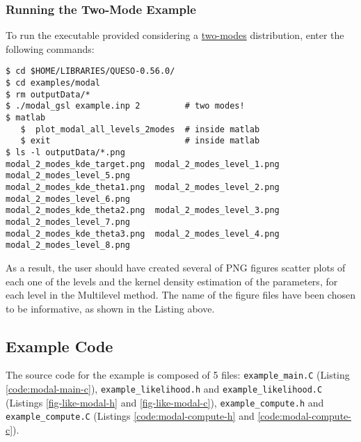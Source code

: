\subsubsection{Running the Two-Mode Example}
 
To run the executable provided considering a \underline{two-modes} distribution, enter the following commands:
\begin{lstlisting}[label={},caption={Running the example with a two-mode distribution.}]
$ cd $HOME/LIBRARIES/QUESO-0.56.0/
$ cd examples/modal
$ rm outputData/*
$ ./modal_gsl example.inp 2         # two modes!
$ matlab
   $  plot_modal_all_levels_2modes  # inside matlab
   $ exit                           # inside matlab
$ ls -l outputData/*.png
modal_2_modes_kde_target.png  modal_2_modes_level_1.png  modal_2_modes_level_5.png
modal_2_modes_kde_theta1.png  modal_2_modes_level_2.png  modal_2_modes_level_6.png
modal_2_modes_kde_theta2.png  modal_2_modes_level_3.png  modal_2_modes_level_7.png
modal_2_modes_kde_theta3.png  modal_2_modes_level_4.png  modal_2_modes_level_8.png
\end{lstlisting}

As a result, the user should have created several of PNG figures scatter plots of each one of the levels and the kernel density estimation of the parameters, for each level in the Multilevel method. The name of the figure files have been chosen to be informative, as shown in the Listing above. 



\subsection{Example Code}\label{sec:modal-code}

The source code for the example is composed of 5 files:
\texttt{example\_main.C} (Listing \ref{code:modal-main-c}), \linebreak
\texttt{example\_likelihood.h} and \texttt{example\_likelihood.C} (Listings \ref{fig-like-modal-h} and \ref{fig-like-modal-c}),
\texttt{example\_compute.h} and \texttt{example\_compute.C} (Listings \ref{code:modal-compute-h} and \ref{code:modal-compute-c}).






